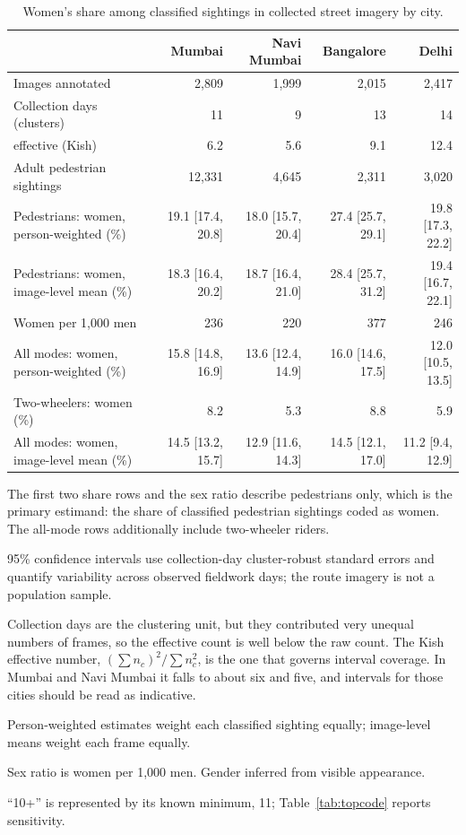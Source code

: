 \begin{table}[t]
\centering
\caption{Women's share among classified sightings in collected street imagery by city.}
\label{tab:city_summary}
\scriptsize
\begin{threeparttable}
\begin{tabular}{@{\extracolsep{0pt}}lrrrr}
\toprule
 & Mumbai & Navi Mumbai & Bangalore & Delhi \\
\midrule
Images annotated & 2,809 & 1,999 & 2,015 & 2,417 \\
Collection days (clusters) & 11 & 9 & 13 & 14 \\
\quad effective (Kish) & 6.2 & 5.6 & 9.1 & 12.4 \\
Adult pedestrian sightings & 12,331 & 4,645 & 2,311 & 3,020 \\
\addlinespace
Pedestrians: women, person-weighted (\%) & 19.1 [17.4, 20.8] & 18.0 [15.7, 20.4] & 27.4 [25.7, 29.1] & 19.8 [17.3, 22.2] \\
Pedestrians: women, image-level mean (\%) & 18.3 [16.4, 20.2] & 18.7 [16.4, 21.0] & 28.4 [25.7, 31.2] & 19.4 [16.7, 22.1] \\
\addlinespace
Women per 1,000 men & 236 & 220 & 377 & 246 \\
\addlinespace
All modes: women, person-weighted (\%) & 15.8 [14.8, 16.9] & 13.6 [12.4, 14.9] & 16.0 [14.6, 17.5] & 12.0 [10.5, 13.5] \\
Two-wheelers: women (\%) & 8.2 & 5.3 & 8.8 & 5.9 \\
All modes: women, image-level mean (\%) & 14.5 [13.2, 15.7] & 12.9 [11.6, 14.3] & 14.5 [12.1, 17.0] & 11.2 [9.4, 12.9] \\
\bottomrule
\end{tabular}
\begin{tablenotes}[flushleft]
\item The first two share rows and the sex ratio describe pedestrians only, which is the primary estimand: the share of classified pedestrian sightings coded as women. The all-mode rows additionally include two-wheeler riders.
\item 95\% confidence intervals use collection-day cluster-robust standard errors and quantify variability across observed fieldwork days; the route imagery is not a population sample.
\item Collection days are the clustering unit, but they contributed very unequal numbers of frames, so the effective count is well below the raw count. The Kish effective number, $(\sum n_c)^2 / \sum n_c^2$, is the one that governs interval coverage. In Mumbai and Navi Mumbai it falls to about six and five, and intervals for those cities should be read as indicative.
\item Person-weighted estimates weight each classified sighting equally; image-level means weight each frame equally.
\item Sex ratio is women per 1,000 men. Gender inferred from visible appearance.
\item ``10+'' is represented by its known minimum, 11; Table~\ref{tab:topcode} reports sensitivity.
\end{tablenotes}
\end{threeparttable}
\end{table}
